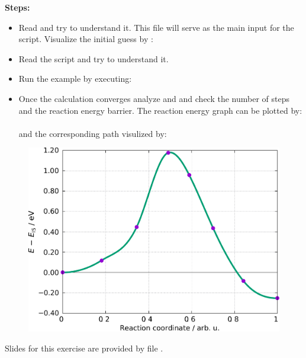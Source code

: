 \documentclass[landscape]{foils}
\begin{document}
{\bf{Steps:}}
\begin{itemize}
\item{Read  and try to understand
    it.
    This file will serve as the main input for the  script. Visualize the initial guess by :\\
    }
\item{Read the  script and try to understand it. }
\item{Run the example by executing:\\ }
\item{Once the calculation converges analyze  and
     and check the number of steps and the reaction
    energy barrier.
    The reaction energy graph can be plotted by:\\
     \\[0.5em]
    and the corresponding path visulized by: \\
     }
\end{itemize}
\begin{figure}
  \centering
    \includegraphics[width=12.0cm]{figs/NEB-H2onAl100-results.pdf}
\end{figure}



Slides for this exercise are provided by file .
%
\end{document}
